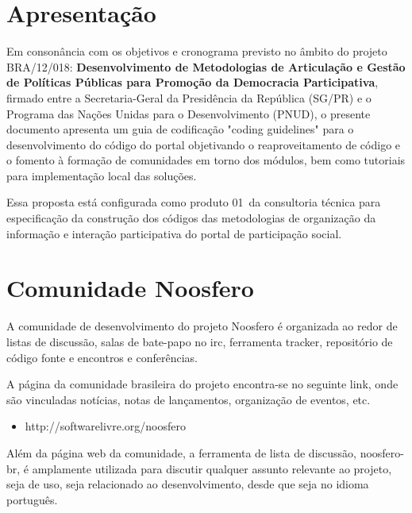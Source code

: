 \documentclass[11pt]{article}
\newcommand{\ProductNumber}{01}
\begin{document}
\lstset{language=Ruby}


\clearpage

\clearpage

\tableofcontents
\clearpage
\listoffigures

\clearpage

\section{Apresentação}

Em consonância com os objetivos e cronograma previsto no âmbito do
projeto BRA/12/018:
\textbf{Desenvolvimento de Metodologias de Articulação e Gestão de
Políticas Públicas para Promoção da Democracia Participativa},
firmado entre a Secretaria-Geral da Presidência da República
(SG/PR) e o Programa das Nações Unidas para o Desenvolvimento (PNUD),
o presente documento apresenta um guia de codificação "coding guidelines" para
o desenvolvimento do código do portal objetivando o reaproveitamento de código
e o fomento à formação de comunidades em torno dos módulos, bem como tutoriais
para implementação local das soluções.

Essa proposta está configurada como produto \ProductNumber~da consultoria técnica
para especificação da construção dos códigos das metodologias de
organização da informação e interação participativa do portal de
participação social.

\section{Comunidade Noosfero}


A comunidade de desenvolvimento do projeto Noosfero é organizada
ao redor de listas de discussão, salas de bate-papo no irc, ferramenta
tracker, repositório de código fonte e encontros e conferências.

A página da comunidade brasileira do projeto encontra-se no seguinte link,
onde são vinculadas notícias, notas de lançamentos, organização
de eventos, etc.

\begin{itemize}
  \item http://softwarelivre.org/noosfero
\end{itemize}

Além da página web da comunidade, a ferramenta de lista de discussão,
noosfero-br, é amplamente utilizada para discutir qualquer assunto
relevante ao projeto, seja de uso, seja relacionado ao desenvolvimento,
desde que seja no idioma português.
\end{document}
